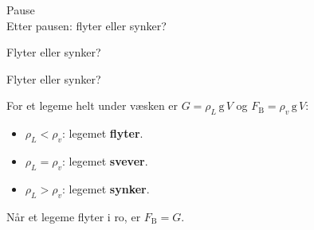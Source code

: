 \documentclass[aspectratio=169, 12pt]{beamer}
\begin{document}
\begin{frame}
\begin{center}
  \Huge{Pause}\\[8pt]
  {\large Etter pausen: flyter eller synker?}
\end{center}
\end{frame}


\begin{frame}{Flyter eller synker?}

  \pause

\end{frame}

\begin{frame}{Flyter eller synker?}

  For et legeme helt under væsken er $G = \rho_L\,\mathrm{g}\,V$ og $F_{\textrm{B}} = \rho_v\,\mathrm{g}\,V$:
  \pause
  \begin{itemize}
    \item $\rho_L < \rho_v$: legemet \textbf{flyter}.
    \item $\rho_L = \rho_v$: legemet \textbf{svever}.
    \item $\rho_L > \rho_v$: legemet \textbf{synker}.
  \end{itemize}
  \pause
  Når et legeme flyter i ro, er $F_{\textrm{B}} = G$.

\end{frame}
\end{document}
